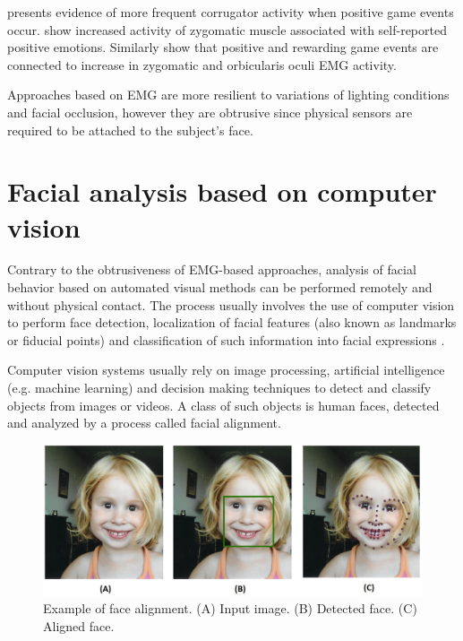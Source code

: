 \textcite{hazlett2006measuring} presents evidence of more frequent corrugator activity when positive game events occur. \textcite{tijs2008dynamic} show increased activity of zygomatic muscle associated with self-reported positive emotions. Similarly \textcite{ravaja20051} show that positive and rewarding game events are connected to increase in zygomatic and orbicularis oculi EMG activity.

Approaches based on EMG are more resilient to variations of lighting conditions and facial occlusion, however they are obtrusive since physical sensors are required to be attached to the subject's face.

\section{Facial analysis based on computer vision}

Contrary to the obtrusiveness of EMG-based approaches, analysis of facial behavior based on automated visual methods can be performed remotely and without physical contact. The process usually involves the use of computer vision to perform face detection, localization of facial features (also known as landmarks or fiducial points) and classification of such information into facial expressions \parencite{salah2010communication}.

Computer vision systems usually rely on image processing, artificial intelligence (e.g. machine learning) and decision making techniques to detect and classify objects from images or videos. A class of such objects is human faces, detected and analyzed by a process called facial alignment.

\begin{figure}[h]
    \centering
    \includegraphics[width=\linewidth]{Content/figures/face_alignment.jpg}
    \caption{Example of face alignment. (A) Input image. (B) Detected face. (C) Aligned face.}
    \label{fig:alignment}
\end{figure}


